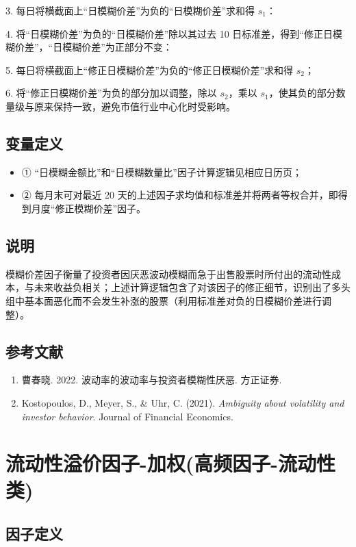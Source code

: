 \documentclass{article}
\begin{document}
3. 每日将横截面上“日模糊价差”为负的“日模糊价差”求和得 \( s_1 \)：

4. 将“日模糊价差”为负的“日模糊价差”除以其过去 10 日标准差，得到“修正日模糊价差”，“日模糊价差”为正部分不变：

5. 每日将横截面上“修正日模糊价差”为负的“修正日模糊价差”求和得 \( s_2 \)；

6. 将“修正日模糊价差”为负的部分加以调整，除以 \( s_2 \)，乘以 \( s_1 \)，使其负的部分数量级与原来保持一致，避免市值行业中心化时受影响。

\subsection{变量定义}
\begin{itemize}
    \item ① “日模糊金额比”和“日模糊数量比”因子计算逻辑见相应日历页；
    \item ② 每月末可对最近 20 天的上述因子求均值和标准差并将两者等权合并，即得到月度“修正模糊价差”因子。
\end{itemize}

\subsection{说明}
模糊价差因子衡量了投资者因厌恶波动模糊而急于出售股票时所付出的流动性成本，与未来收益负相关；上述计算逻辑包含了对该因子的修正细节，识别出了多头组中基本面恶化而不会发生补涨的股票（利用标准差对负的日模糊价差进行调整）。

\subsection{参考文献}
\begin{enumerate}
    \item 曹春晓. 2022. 波动率的波动率与投资者模糊性厌恶. 方正证券.
    \item Kostopoulos, D., Meyer, S., \& Uhr, C. (2021). \textit{Ambiguity about volatility and investor behavior}. Journal of Financial Economics.
\end{enumerate}

\section{流动性溢价因子-加权(高频因子-流动性类)}

\subsection{因子定义}
\end{document}
